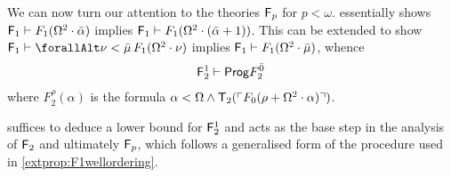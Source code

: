 \documentclass[UKenglish,cleveref,DIV=12]{scrartcl}
\let\forall\forallAlt
\theoremstyle{definition}
\theoremstyle{definition}
\begin{document}
We can now turn our attention to the theories $\mathsf{F}_p$ for $p<\omega$.
 essentially shows $\mathsf{F}_1\vdash
F_1(\Omega^2\cdot\bar\alpha)$ implies $\mathsf{F}_1\vdash
F_1(\Omega^2\cdot(\bar\alpha+1))$. This can be extended to show $\F_1\proves\forall\nu<\bar\mu\,F_1(\Omega^2\cdot\nu)$ implies $\mathsf{F}_1\vdash F_1(\Omega^2\cdot\bar\mu)$, whence
\begin{gather}\label{exteqn:Fbwell1}
  \mathsf{F}_2^1\vdash \mathsf{Prog}  F^{\bar 0}_2
\end{gather}
where $F_2^{\rho}(\alpha)$ is the formula $\alpha<\Omega\land\mathsf{T}_2(\ulcorner{F_0(\rho+\Omega^2\cdot\alpha)}\urcorner)$.

 suffices to deduce a lower bound for $\mathsf{F}_2^1$ and acts as
the base step in the analysis of $\mathsf{F}_2$ and ultimately $\mathsf{F}_p$, which follows a
generalised form of the procedure used in \cref{extprop:F1wellordering}.
\end{document}
